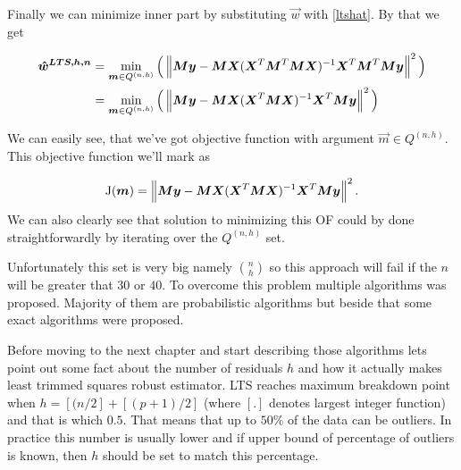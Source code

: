 Finally we can minimize inner part by substituting $\vec{w}$ with \ref{ltshat}. By that we get

\begin{align*}
    \boldsymbol{\hat{w}^{LTS, h, n}}
    &=  \operatorname*{min}_{\boldsymbol{m} \in Q^{(n,h)}} 
    \Big( \left\lVert \boldsymbol{M}\boldsymbol{y} -  \boldsymbol{M}\boldsymbol{X}(\boldsymbol{X}^T\boldsymbol{M}^T\boldsymbol{M}\boldsymbol{X})^{-1}\boldsymbol{X}^T\boldsymbol{M}^T\boldsymbol{M}\boldsymbol{y}  \right\rVert^2 \Big)\\
    &= \operatorname*{min}_{\boldsymbol{m} \in Q^{(n,h)}} 
    \Big( \left\lVert \boldsymbol{M}\boldsymbol{y} -  \boldsymbol{M}\boldsymbol{X}(\boldsymbol{X}^T\boldsymbol{M}\boldsymbol{X})^{-1}\boldsymbol{X}^T\boldsymbol{M}\boldsymbol{y}  \right\rVert^2 \Big)
\end{align*}

We can easily see, that we've got objective function with argument $\vec{m} \in Q^{(n,h)}$. This objective function we'll mark as 

\begin{equation} 
    \operatorname{J}(\boldsymbol{m}) =  \left\lVert \boldsymbol{M}\boldsymbol{y} -  \boldsymbol{M}\boldsymbol{X}(\boldsymbol{X}^T\boldsymbol{M}\boldsymbol{X})^{-1}\boldsymbol{X}^T\boldsymbol{M}\boldsymbol{y}  \right\rVert^2.
\end{equation}
We can also clearly see that solution to minimizing this OF could by done straightforwardly by iterating over the  $Q^{(n,h)}$ set.

Unfortunately this set is very big namely $\binom{n}{h}$ so this approach will fail if the $n$ will be greater that $30$ or $40$. To overcome this problem multiple algorithms was proposed. Majority of them are probabilistic algorithms but beside that some exact algorithms were proposed. 

Before moving to the next chapter and start describing those algorithms lets point out some fact about the number of residuals $h$ and how it actually makes least trimmed squares robust estimator.
LTS reaches maximum breakdown point when $h = [(n/2] + [(p+1)/2]$ (where $[.]$ denotes largest integer function) and that is  which $0.5$. That means that up to $50\%$ of the data can be outliers. In practice this number is usually lower and if upper bound of percentage of outliers is known, then $h$ should be set to match this percentage.




